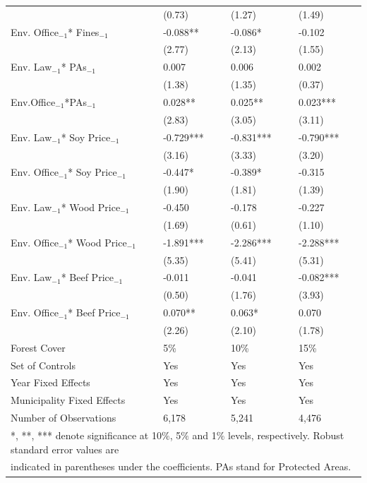 \begin{table}[htpb!]
\begin{tabularx}{\columnwidth}{l XXX}
                    & 		(0.73)	&	(1.27)	&	(1.49)		\\
    Env. Office$_{-1}$* Fines$_{-1}$ & 	-0.088**	&	-0.086*	&	-0.102	\\
                    & 		(2.77)	&	(2.13)	&	(1.55)		\\
    Env. Law$_{-1}$* PAs$_{-1}$ &	0.007	&	0.006	&	0.002		\\
                    & 		(1.38)	&	(1.35)	&	(0.37)		\\
    Env.Office$_{-1}$*PAs$_{-1}$&  0.028**	&	0.025**	&	0.023***		\\
                    & 		(2.83)	&	(3.05)	&	(3.11)	\\
    Env. Law$_{-1}$* Soy Price$_{-1}$ & -0.729***	&	-0.831***	&	-0.790***	\\
                    & 		(3.16)	&	(3.33)	&	(3.20)		\\
    Env. Office$_{-1}$* Soy Price$_{-1}$  & -0.447*	&	-0.389*	&	-0.315	\\
                    & 		(1.90)	&	(1.81)	&	(1.39)		\\
    Env. Law$_{-1}$* Wood Price$_{-1}$ & -0.450	&	-0.178	&	-0.227		\\
                    & 		(1.69)	&	(0.61)	&	(1.10)	\\
    Env. Office$_{-1}$* Wood Price$_{-1}$ & -1.891***	&	-2.286***	&	-2.288***	\\
                    & 		(5.35)	&	(5.41)	&	(5.31)	\\
    Env. Law$_{-1}$* Beef Price$_{-1}$ & -0.011	&	-0.041	&	-0.082***		\\
                    & 		(0.50)	&	(1.76)	&	(3.93)		\\
    Env. Office$_{-1}$* Beef Price$_{-1}$ &	0.070**	&	0.063*	&	0.070\\
                    & 		(2.26)	&	(2.10)	&	(1.78)		\\
    \hline
    Forest Cover &      5\% & 10\% & 15\%  \\
    Set of Controls &   Yes & Yes & Yes  \\
    Year Fixed Effects &   Yes & Yes & Yes  \\
    Municipality Fixed Effects &   Yes & Yes & Yes  \\
    Number of Observations &   6,178 &   5,241 &  4,476 \\
    \hline
    \hline
    \multicolumn{4}{l}{*, **, *** denote significance at 10$\%$, 5$\%$ and 1$\%$ levels, respectively. Robust standard error values are} \\
    \multicolumn{4}{l}{indicated in parentheses under the coefficients. PAs stand for Protected Areas.} \\
    \end{tabularx}
  \label{tab:resultsRBC3.1}%
\end{table}%


